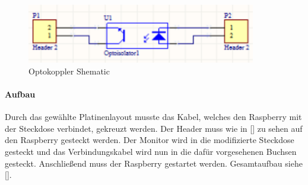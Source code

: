 \begin{figure}[H]
\centering
\includegraphics[keepaspectratio=true, width=10cm]{images/rpi/Optokoppler_Schematic.png}
\caption{Optokoppler Shematic}
\label{fig:report_hardware_OptSche}
\end{figure}
\paragraph{Aufbau}
Durch das gewählte Platinenlayout musste das Kabel, welches den Raspberry mit der Steckdose verbindet, gekreuzt werden. Der Header muss wie in \autoref{} zu sehen auf den Raspberry gesteckt werden. Der Monitor wird in die modifizierte Steckdose gesteckt und das Verbindungskabel wird nun in die dafür vorgesehenen Buchsen gesteckt. Anschließend muss der Raspberry gestartet werden. Gesamtaufbau siehe \autoref{}.